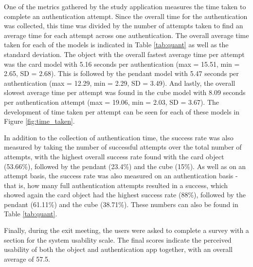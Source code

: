 \documentclass{l4proj}
\begin{document}
One of the metrics gathered by the study application measures the time taken to complete an authentication attempt. Since the overall time for the authentication was collected, this time was divided by the number of attempts taken to find an average time for each attempt across one authentication. The overall average time taken for each of the models is indicated in Table \ref{tab:quant} as well as the standard deviation. The object with the overall fastest average time per attempt was the card model with 5.16 seconds per authentication (max = 15.51, min = 2.65, SD = 2.68). This is followed by the pendant model with 5.47 seconds per authentication (max = 12.29, min = 2.29, SD = 3.49). And lastly, the overall slowest average time per attempt was found in the cube model with 8.09 seconds per authentication attempt (max = 19.06, min = 2.03, SD = 3.67). The development of time taken per attempt can be seen for each of these models in Figure \ref{fig:time_taken}.

In addition to the collection of authentication time, the success rate was also measured by taking the number of successful attempts over the total number of attempts, with the highest overall success rate found with the card object (53.66\%), followed by the pendant (23.4\%) and the cube (15\%). As well as on an attempt basis, the success rate was also measured on an authentication basis - that is, how many full authentication attempts resulted in a success, which showed again the card object had the highest success rate (88\%), followed by the pendant (61.11\%) and the cube (38.71\%). These numbers can also be found in Table \ref{tab:quant}.

Finally, during the exit meeting, the users were asked to complete a survey with a section for the system usability scale. The final scores indicate the perceived usability of both the object and authentication app together, with an overall average of 57.5.

\begin{table}[]
    \centering
    \caption{Table detailing the quantitative results for each participant and model}
    \label{tab:quant}
\end{table}
\end{document}
